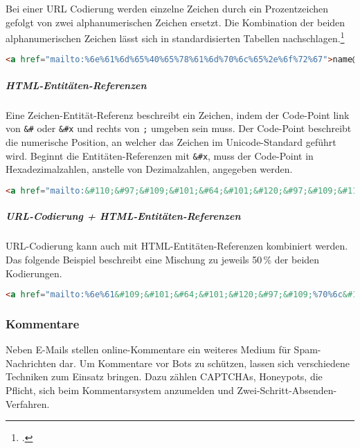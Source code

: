 Bei einer URL Codierung werden einzelne Zeichen durch ein Prozentzeichen
gefolgt von zwei alphanumerischen Zeichen ersetzt. Die Kombination der beiden
alphanumerischen Zeichen lässt sich in standardisierten Tabellen
nachschlagen.\footcite{rfc:3986}

\begin{lstlisting}[language=HTML]
<a href="mailto:%6e%61%6d%65%40%65%78%61%6d%70%6c%65%2e%6f%72%67">name@example.org</a>
\end{lstlisting}

\subparagraph{HTML-Entitäten-Referenzen}
\label{spar:html-entitaeten-referenzen}

Eine Zeichen-Entität-Referenz beschreibt ein Zeichen, indem der Code-Point link
von \texttt{\&\#} oder \texttt{\&\#x} und rechts von \texttt{;} umgeben sein
muss. Der Code-Point beschreibt die numerische Position, an welcher das Zeichen
im Unicode-Standard geführt wird. Beginnt die Entitäten-Referenzen mit
\texttt{\&\#x}, muss der Code-Point in Hexadezimalzahlen, anstelle von
Dezimalzahlen, angegeben werden.

\begin{lstlisting}[language=HTML]
<a href="mailto:&#110;&#97;&#109;&#101;&#64;&#101;&#120;&#97;&#109;&#112;&#108;&#101;&#46;&#111;&#114;&#103;">name@example.org</a>
\end{lstlisting}

\subparagraph{URL-Codierung + HTML-Entitäten-Referenzen}
\label{spar:url-codierung-html-entitaeten-referenzen}

URL-Codierung kann auch mit HTML-Entitäten-Referenzen kombiniert werden. Das
folgende Beispiel beschreibt eine Mischung zu jeweils 50\,\% der beiden
Kodierungen.

\begin{lstlisting}[language=HTML]
<a href="mailto:%6e%61&#109;&#101;&#64;&#101;&#120;&#97;&#109;%70%6c&#101;%2e&#111;%72&#103;">name@example.org</a>
\end{lstlisting}

\subsubsection{Kommentare}
\label{ssub:kommentare}

Neben E-Mails stellen online-Kommentare ein weiteres Medium für
Spam-Nachrichten dar. Um Kommentare vor Bots zu schützen, lassen sich
verschiedene Techniken zum Einsatz bringen. Dazu zählen
CAPTCHAs, Honeypots, die Pflicht,
sich beim Kommentarsystem anzumelden und Zwei-Schritt-Absenden-Verfahren.

